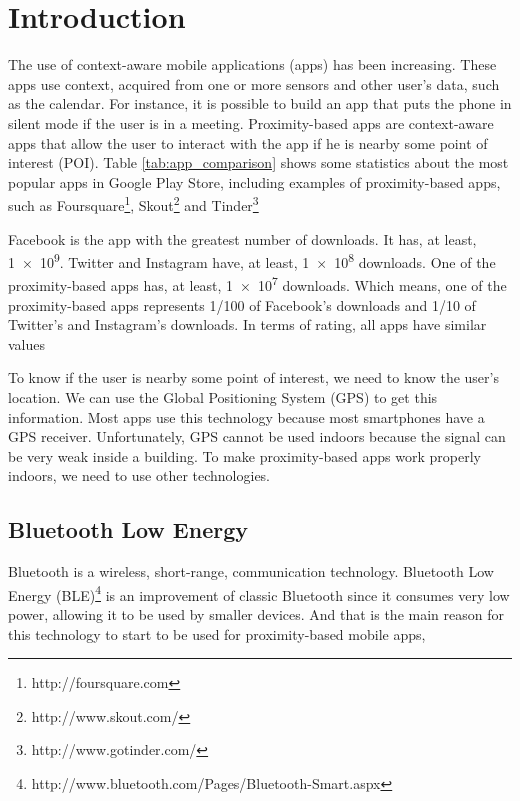 
\chapter{Introduction}
\label{chapter:introduction}


%
%

The use of context-aware mobile applications (apps)
has been increasing.
These apps use context, acquired
from one or more sensors and other user's data,
such as the calendar. For instance, it is possible to
build an app that puts the phone in silent mode if the
user is in a meeting. Proximity-based apps are
context-aware apps that allow the user to interact
with the app if he is nearby some point of interest (POI).
Table \ref{tab:app_comparison} shows some statistics
about the most popular apps in Google Play Store,
including examples of proximity-based apps,
such as Foursquare\footnote{http://foursquare.com},
Skout\footnote{http://www.skout.com/} and
Tinder\footnote{http://www.gotinder.com/}



Facebook is the app with the
greatest number of downloads.
It has, at least, \num{1e9}. Twitter and Instagram
have, at least, \num{1e8} downloads.
One of the
proximity-based apps has, at least, \num{1e7} downloads.
Which means, one of
the proximity-based apps represents
1/100 of Facebook's downloads and 1/10 of Twitter's
and Instagram's downloads. In terms of rating, all apps
have similar values

To know if the user is nearby some point of interest,
we need to know the user's location. We can use
the Global Positioning System
(GPS)\cite{masumoto1993global} to
get this information. Most apps use this technology
because most smartphones have a GPS receiver.
Unfortunately, GPS cannot be used indoors because
the signal can
be very weak inside a building. To make proximity-based
apps work properly indoors, we need to use other
technologies.

\section{Bluetooth Low Energy}
\label{sub:bluetooth_low_energy}
Bluetooth is a wireless, short-range, communication technology.
Bluetooth Low Energy (BLE)\footnote{http://www.bluetooth.com/Pages/Bluetooth-Smart.aspx}
is an improvement of classic Bluetooth since it consumes
very low power, allowing it to be used by smaller devices.
And that is the main reason for this technology to start to
be used for proximity-based mobile apps,

